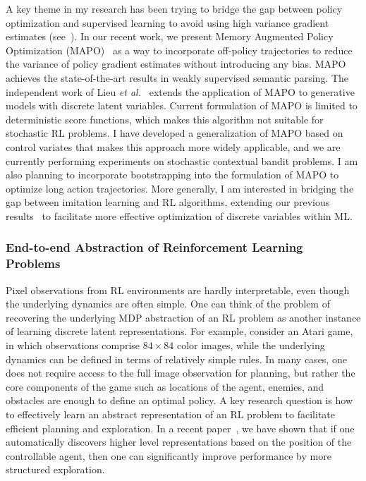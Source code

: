 \documentclass[a4paper, 10pt]{article}
\begin{document}
{A key theme in my research has been trying to bridge the gap between
policy optimization and supervised learning to avoid using high
variance gradient estimates (see~\cite{raml,pqt2018,ocd,dvn,mapo}).
In our recent work, we present Memory Augmented Policy Optimization
(MAPO)~\cite{mapo} as a way to incorporate off-policy trajectories to
reduce the variance of policy gradient estimates without introducing
any bias. MAPO achieves the state-of-the-art results in weakly
supervised semantic parsing. The independent work of Lieu {\em et
  al.}~\cite{liu2018rao} extends the application of MAPO to generative
models with discrete latent variables. Current formulation of MAPO is
limited to deterministic score functions, which makes this algorithm
not suitable for stochastic RL problems. I have developed a
generalization of MAPO based on control variates that makes this
approach more widely applicable, and we are currently performing
experiments on stochastic contextual bandit problems. I am also
planning to incorporate bootstrapping into the formulation of MAPO to
optimize long action trajectories. More generally, I am interested in
bridging the gap between imitation learning and RL algorithms,
extending our previous results~\cite{ocd} to facilitate more effective
optimization of discrete variables within ML.

\vspace*{-.2cm}
\subsubsection*{End-to-end Abstraction of Reinforcement Learning Problems}
\vspace*{-.1cm}

\hspace{\parindent} Pixel observations from RL environments are hardly
interpretable, even though the underlying dynamics are often
simple. One can think of the problem of recovering the underlying MDP
abstraction of an RL problem as another instance of learning discrete
latent representations. For example, consider an Atari game, in which
observations comprise $84\!\times\!84$ color images, while the
underlying dynamics can be defined in terms of relatively simple
rules. In many cases, one does not require access to the full image
observation for planning, but rather the core components of the game
such as locations of the agent, enemies, and obstacles are enough
to define an optimal policy. A key research question is how to
effectively learn an abstract representation of an RL problem to
facilitate efficient planning and exploration. In a recent
paper~\cite{coex}, we have shown that if one automatically discovers
higher level representations based on the position of the controllable
agent, then one can significantly improve performance by more
structured exploration.

}
\end{document}
